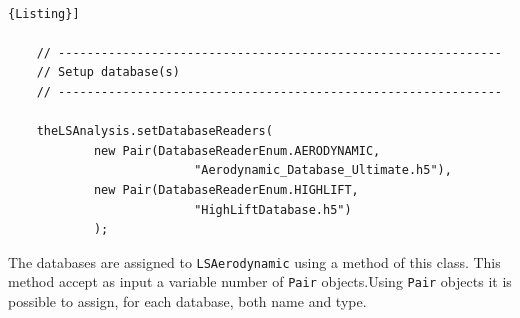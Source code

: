 %
%		
%		
%		
%		
%		
%		
%		
%
%		

\noindent \\
\begin{lstlisting}[frame=rbl,caption={{\footnotesize Assign database using an Aircraft object}},label= [style=\bfseries]{Listing}]
		
	// --------------------------------------------------------------
	// Setup database(s)	
	// --------------------------------------------------------------
		
	theLSAnalysis.setDatabaseReaders(
			new Pair(DatabaseReaderEnum.AERODYNAMIC,
                          "Aerodynamic_Database_Ultimate.h5"),
			new Pair(DatabaseReaderEnum.HIGHLIFT,  
                          "HighLiftDatabase.h5")
			);

\end{lstlisting}
The databases are assigned to \texttt{LSAerodynamic} using a method of this class. This method accept as input a variable number of \texttt{Pair} objects.Using \texttt{Pair} objects it is possible to assign, for each database, both name and type. 

